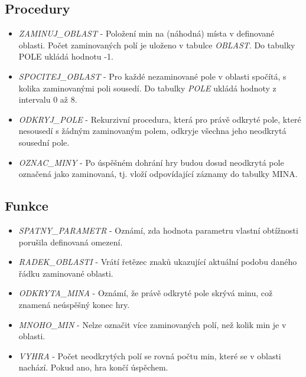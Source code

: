 \documentclass{article}
\begin{document}
\subsection{Procedury}
{\renewcommand\labelitemi{}
\begin{itemize}
    \item \textit{ZAMINUJ\_OBLAST} - Položení min na (náhodná) místa v definované oblasti. Počet
    zaminovaných polí je uloženo v tabulce \textit{OBLAST}. Do tabulky POLE
    ukládá hodnotu -1.
    
    \item \textit{SPOCITEJ\_OBLAST} - Pro každé nezaminované pole v oblasti spočítá, s kolika zaminovanými
    poli sousedí. Do tabulky \textit{POLE} ukládá hodnoty z intervalu 0 až 8.
    
    \item \textit{ODKRYJ\_POLE} - Rekurzivní procedura, která pro právě odkryté pole, které nesousedí
    s žádným zaminovaným polem, odkryje všechna jeho neodkrytá
    sousední pole.
    
    \item \textit{OZNAC\_MINY} - Po úspěšném dohrání hry budou dosud neodkrytá pole označená jako
    zaminovaná, tj. vloží odpovídající záznamy do tabulky MINA.
\end{itemize}
}

\subsection{Funkce}
{\renewcommand\labelitemi{}
\begin{itemize}
    \item \textit{SPATNY\_PARAMETR} - Oznámí, zda hodnota parametru vlastní obtížnosti porušila definovaná
    omezení.
    
    \item \textit{RADEK\_OBLASTI} - Vrátí řetězec znaků ukazující aktuální podobu daného řádku
    zaminované oblasti.
    
    \item \textit{ODKRYTA\_MINA} - Oznámí, že právě odkryté pole skrývá minu, což znamená neúspěšný
    konec hry.
    
    \item \textit{MNOHO\_MIN} - Nelze označit více zaminovaných polí, než kolik min je v oblasti.
    
    \item \textit{VYHRA} - Počet neodkrytých polí se rovná počtu min, které se v oblasti nachází.
    Pokud ano, hra končí úspěchem.
\end{itemize}
}
\end{document}
